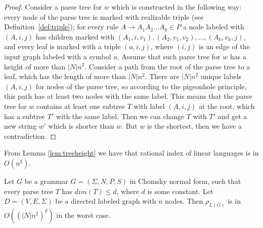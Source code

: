 \begin{proof}
Consider a parse tree for $w$ which is constructed in the following way: every node of the parse tree is marked with realizable triple (see Definition~\ref{def:triple}); for every rule $A \rightarrow A_1A_2...A_k \in P$ a node labeled with $(A, i, j)$ has children marked with $(A_1, i, v_1), (A_2, v_1, v_2), ..., (A_k, v_k, j)$, and every leaf is marked with a triple $(a, i, j)$, where $(i, j)$ is an edge of the input graph labeled with a symbol $a$. Assume that such parse tree for $w$ has a height of more than $|N|n^2$. Consider a path from the root of the parse tree to a leaf, which has the length of more than $|N|n^2$. There are $|N|n^2$ unique labels $(A, i, j)$ for nodes of the parse tree, so according to the pigeonhole principle, this path has at least two nodes with the same label. This means that the parse tree for $w$ contains at least one subtree $T$ with label $(A, i, j)$ at the root, which has a subtree $T'$ with the same label. Then we can change $T$ with $T'$ and get a new string $w'$ which is shorter than $w$. But $w$ is the shortest, then we have a contradiction.

\end{proof}
From Lemma \ref{lem:treeheight} we have that rational index of linear languages is in $O(n^2)$. 
\begin{lemma}
\label{oscbnddim}
Let $G$ be a grammar $G = (\Sigma, N, P, S)$ in Chomsky normal form, such that every parse tree $T$ has $dim(T) \le d$, where $d$ is some constant. Let $D=(V, E, \Sigma)$ be a directed labeled graph with $n$ nodes. Then $\rho_{L(G)}$ is in $O({(|N|n^2)}^d)$ in the worst case.
\end{lemma}
